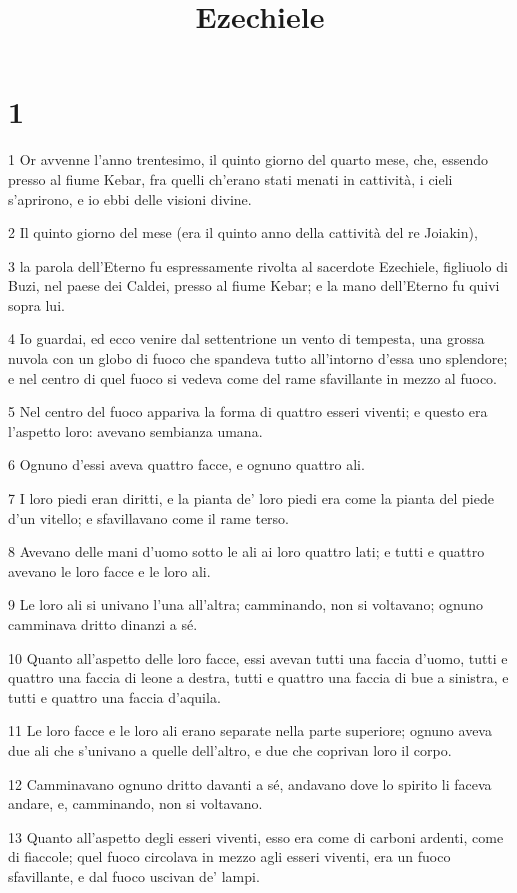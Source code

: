 

\title{Ezechiele}


\chapter{1}

\par 1 Or avvenne l'anno trentesimo, il quinto giorno del quarto mese, che, essendo presso al fiume Kebar, fra quelli ch'erano stati menati in cattività, i cieli s'aprirono, e io ebbi delle visioni divine.
\par 2 Il quinto giorno del mese (era il quinto anno della cattività del re Joiakin),
\par 3 la parola dell'Eterno fu espressamente rivolta al sacerdote Ezechiele, figliuolo di Buzi, nel paese dei Caldei, presso al fiume Kebar; e la mano dell'Eterno fu quivi sopra lui.
\par 4 Io guardai, ed ecco venire dal settentrione un vento di tempesta, una grossa nuvola con un globo di fuoco che spandeva tutto all'intorno d'essa uno splendore; e nel centro di quel fuoco si vedeva come del rame sfavillante in mezzo al fuoco.
\par 5 Nel centro del fuoco appariva la forma di quattro esseri viventi; e questo era l'aspetto loro: avevano sembianza umana.
\par 6 Ognuno d'essi aveva quattro facce, e ognuno quattro ali.
\par 7 I loro piedi eran diritti, e la pianta de' loro piedi era come la pianta del piede d'un vitello; e sfavillavano come il rame terso.
\par 8 Avevano delle mani d'uomo sotto le ali ai loro quattro lati; e tutti e quattro avevano le loro facce e le loro ali.
\par 9 Le loro ali si univano l'una all'altra; camminando, non si voltavano; ognuno camminava dritto dinanzi a sé.
\par 10 Quanto all'aspetto delle loro facce, essi avevan tutti una faccia d'uomo, tutti e quattro una faccia di leone a destra, tutti e quattro una faccia di bue a sinistra, e tutti e quattro una faccia d'aquila.
\par 11 Le loro facce e le loro ali erano separate nella parte superiore; ognuno aveva due ali che s'univano a quelle dell'altro, e due che coprivan loro il corpo.
\par 12 Camminavano ognuno dritto davanti a sé, andavano dove lo spirito li faceva andare, e, camminando, non si voltavano.
\par 13 Quanto all'aspetto degli esseri viventi, esso era come di carboni ardenti, come di fiaccole; quel fuoco circolava in mezzo agli esseri viventi, era un fuoco sfavillante, e dal fuoco uscivan de' lampi.
